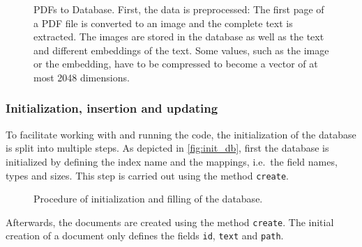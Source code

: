 \begin{figure}[!htp] %
    \centering
    
    \caption[Database procedure]{PDFs to Database. 
    First, the data is preprocessed:
    The first page of a PDF file is converted to an image and the complete text is extracted. 
    The images are stored in the database as well as the text and different embeddings of the text.
    Some values, such as the image or the \infersent{} embedding, have to be compressed to become a vector of at most 2048 dimensions.
    }
    \label{fig:pdf2db}
\end{figure}

\subsubsection*{Initialization, insertion and updating}
To facilitate working with and running the code, the initialization of the database is split into multiple steps.
As depicted in \autoref{fig:init_db}, first the database is initialized by defining the index name and the mappings, i.e.\ the field names, types and sizes.
This step is carried out using the method \texttt{create}.

\begin{figure}[!htp] %
    \centering
    
    \caption[Initialization and filling of the database]{Procedure of initialization and filling of the database.}
    \label{fig:init_db}
\end{figure}

Afterwards, the documents are created using the method \texttt{create}.
The initial creation of a document only defines the fields \texttt{id}, \texttt{text} and \texttt{path}.



